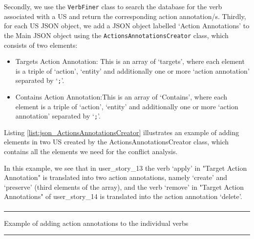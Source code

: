Secondly, we use the \texttt{VerbFiner} class to search the database for the verb associated with a US and return the corresponding action annotation/s. Thirdly, for each US JSON object, we add a JSON object labelled ‘Action Annotations’ to the Main JSON object using the \texttt{ActionsAnnotationsCreator} class, which consists of two elements:
\begin{itemize}
	\item Targets Action Annotation: This is an array of ‘targets’, where each element is a triple of ‘action’, ‘entity’ and additionally one or more ‘action annotation’ separated by ‘\texttt{;}’.
	
	\item Contains Action Annotation:This is an array of ‘Contains’, where each element is a triple of ‘action’, ‘entity’ and additionally one or more ‘action annotation’ separated by ‘\texttt{;}’.
\end{itemize}
\begin{example}
Listing \ref{list:json_ActionsAnnotationsCreator} illustrates an example of adding elements in two US created by the ActionsAnnotationsCreator class, which contains all the elements we need for the conflict analysis.

In this example, we see that in user\_story\_13 the verb ‘apply’ in "Target Action Annotation" is translated into two action annotations, namely ‘create’ and ‘preserve’ (third elements of the array), and the verb ‘remove’ in "Target Action Annotations" of user\_story\_14 is translated into the action annotation ‘delete’.
\end{example}
\begin{MyListing}
	\paragraph{}
	\hrule
	\centering
	
	\caption{Example of adding action annotations to the individual verbs}\label{list:json_ActionsAnnotationsCreator}
	\hrule
\end{MyListing}
